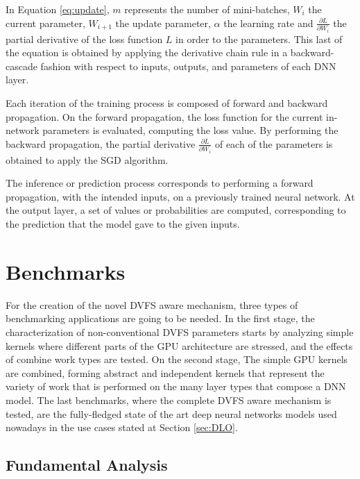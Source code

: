In Equation \ref{eq:update}, $m$ represents the number of mini-batches, $W_i$ the current parameter, $W_{i+1}$ the update parameter, $\alpha$ the learning rate and $\frac{\partial L}{\partial W_i}$ the partial derivative of the loss function $L$ in order to the parameters. This last of the equation is obtained by applying the derivative chain rule in a backward-cascade fashion with respect to inputs, outputs, and parameters of each DNN layer.

Each iteration of the training process is composed of forward and backward propagation. On the forward propagation, the loss function for the current in-network parameters is evaluated, computing the loss value. By performing the backward propagation, the partial derivative $\frac{\partial L}{\partial W_i}$ of each of the parameters is obtained to apply the SGD algorithm. 

The inference or prediction process corresponds to performing a forward propagation, with the intended inputs, on a previously trained neural network. At the output layer, a set of values or probabilities are computed, corresponding to the prediction that the model gave to the given inputs.

\section{Benchmarks}

For the creation of the novel DVFS aware mechanism, three types of benchmarking applications are going to be needed. In the first stage, the characterization of non-conventional DVFS parameters starts by analyzing simple kernels where different parts of the GPU architecture are stressed, and the effects of combine work types are tested. On the second stage, The simple GPU kernels are combined, forming abstract and independent kernels that represent the variety of work that is performed on the many layer types that compose a DNN model. The last benchmarks, where the complete DVFS aware mechanism is tested, are the fully-fledged state of the art deep neural networks models used nowadays in the use cases stated at Section \ref{sec:DLO}.

\subsection{Fundamental Analysis}
\label{sec:funAnal}

